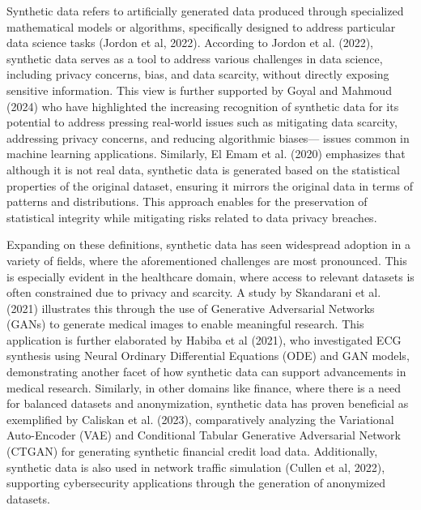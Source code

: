 \documentclass{article}
\begin{document}
Synthetic data refers to artificially generated data produced through specialized mathematical models or algorithms, specifically designed to address particular data science tasks (Jordon et al, 2022). According to Jordon et al. (2022), synthetic data serves as a tool to address various challenges in data science, including privacy concerns, bias, and data scarcity, without directly exposing sensitive information. This view is further supported by Goyal and Mahmoud (2024) who have highlighted the increasing recognition of synthetic data for its potential to address pressing real-world issues such as mitigating data scarcity, addressing privacy concerns, and reducing algorithmic biases— issues common in machine learning applications. Similarly, El Emam et al. (2020) emphasizes that although it is not real data, synthetic data is generated based on the statistical properties of the original dataset, ensuring it mirrors the original data in terms of patterns and distributions. This approach enables for the preservation of statistical integrity while mitigating risks related to data privacy breaches.  

Expanding on these definitions, synthetic data has seen widespread adoption in a variety of fields, where the aforementioned challenges are most pronounced. This is especially evident in the healthcare domain, where access to relevant datasets is often constrained due to privacy and scarcity. A study by Skandarani et al. (2021) illustrates this through the use of Generative Adversarial Networks (GANs) to generate medical images to enable meaningful research. This application is further elaborated by Habiba et al (2021), who investigated ECG synthesis using Neural Ordinary Differential Equations (ODE) and GAN models, demonstrating another facet of how synthetic data can support advancements in medical research. Similarly, in other domains like finance, where there is a need for balanced datasets and anonymization, synthetic data has proven beneficial as exemplified by Caliskan et al. (2023), comparatively analyzing the Variational Auto-Encoder (VAE) and Conditional Tabular Generative Adversarial Network (CTGAN) for generating synthetic financial credit load data. Additionally, synthetic data is also used in network traffic simulation (Cullen et al, 2022), supporting cybersecurity applications through the generation of anonymized datasets.
\end{document}
